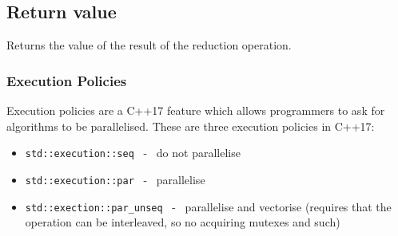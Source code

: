 \documentclass{report}
\begin{document}
\subsection*{Return value}
Returns the value of the result of the reduction operation.
\subsubsection*{Execution Policies}
Execution policies are a C++17 feature which allows programmers to ask for algorithms to be parallelised. These are three execution policies in C++17:
\begin{itemize}
    \item \texttt{std::execution::seq} \ - \ do not parallelise
    \item \texttt{std::execution::par} \ - \ parallelise
    \item \texttt{std::exection::par\_unseq} \ - \ parallelise and vectorise (requires that the operation can be interleaved, so no acquiring mutexes and such)
\end{itemize} 
\end{document}
